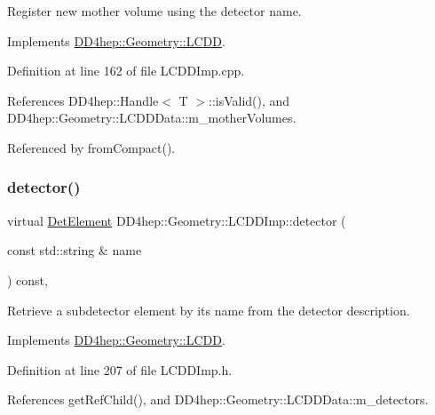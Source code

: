 Register new mother volume using the detector name. 



Implements \hyperlink{class_d_d4hep_1_1_geometry_1_1_l_c_d_d_a6cbadc0074dd9cc3b88b5e0a527586a2}{D\+D4hep\+::\+Geometry\+::\+L\+C\+DD}.



Definition at line 162 of file L\+C\+D\+D\+Imp.\+cpp.



References D\+D4hep\+::\+Handle$<$ T $>$\+::is\+Valid(), and D\+D4hep\+::\+Geometry\+::\+L\+C\+D\+D\+Data\+::m\+\_\+mother\+Volumes.



Referenced by from\+Compact().

\hypertarget{class_d_d4hep_1_1_geometry_1_1_l_c_d_d_imp_af8a5b886ba20e4daa92945f562b0b3dc}{}\label{class_d_d4hep_1_1_geometry_1_1_l_c_d_d_imp_af8a5b886ba20e4daa92945f562b0b3dc} 
\subsubsection{\texorpdfstring{detector()}{detector()}}
{\footnotesize\ttfamily virtual \hyperlink{class_d_d4hep_1_1_geometry_1_1_det_element}{Det\+Element} D\+D4hep\+::\+Geometry\+::\+L\+C\+D\+D\+Imp\+::detector (\begin{DoxyParamCaption}\item[{const std\+::string \&}]{name }\end{DoxyParamCaption}) const\hspace{0.3cm}{\ttfamily [inline]}, {\ttfamily [virtual]}}



Retrieve a subdetector element by it\textquotesingle{}s name from the detector description. 



Implements \hyperlink{class_d_d4hep_1_1_geometry_1_1_l_c_d_d_a0ed0c4e5d72a1e07ce11cf2592d6de3e}{D\+D4hep\+::\+Geometry\+::\+L\+C\+DD}.



Definition at line 207 of file L\+C\+D\+D\+Imp.\+h.



References get\+Ref\+Child(), and D\+D4hep\+::\+Geometry\+::\+L\+C\+D\+D\+Data\+::m\+\_\+detectors.

